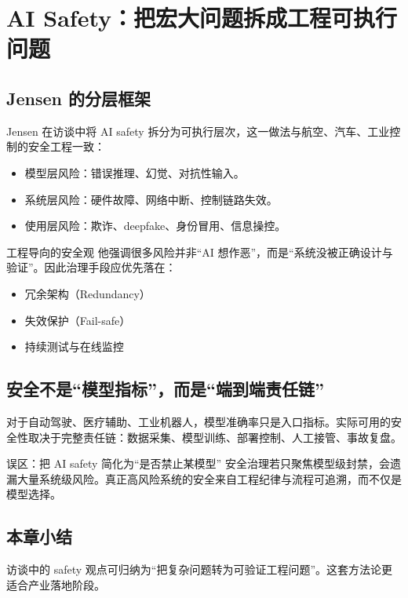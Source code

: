 \section{AI Safety：把宏大问题拆成工程可执行问题}

\subsection{Jensen 的分层框架}

Jensen 在访谈中将 AI safety 拆分为可执行层次，这一做法与航空、汽车、工业控制的安全工程一致：
\begin{itemize}
    \item 模型层风险：错误推理、幻觉、对抗性输入。
    \item 系统层风险：硬件故障、网络中断、控制链路失效。
    \item 使用层风险：欺诈、deepfake、身份冒用、信息操控。
\end{itemize}

\begin{importantbox}{工程导向的安全观}
他强调很多风险并非“AI 想作恶”，而是“系统没被正确设计与验证”。因此治理手段应优先落在：
\begin{itemize}
    \item 冗余架构（Redundancy）
    \item 失效保护（Fail-safe）
    \item 持续测试与在线监控
\end{itemize}
\end{importantbox}

\subsection{安全不是“模型指标”，而是“端到端责任链”}

对于自动驾驶、医疗辅助、工业机器人，模型准确率只是入口指标。实际可用的安全性取决于完整责任链：数据采集、模型训练、部署控制、人工接管、事故复盘。

\begin{warningbox}{误区：把 AI safety 简化为“是否禁止某模型”}
安全治理若只聚焦模型级封禁，会遗漏大量系统级风险。真正高风险系统的安全来自工程纪律与流程可追溯，而不仅是模型选择。
\end{warningbox}

\subsection{本章小结}
访谈中的 safety 观点可归纳为“把复杂问题转为可验证工程问题”。这套方法论更适合产业落地阶段。

